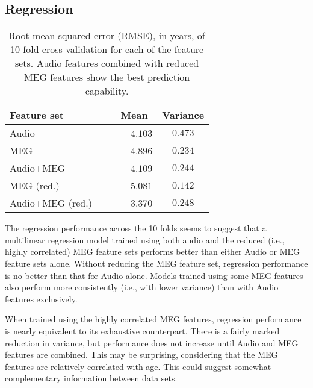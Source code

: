 \documentclass[utf8]{frontiersSCNS} %
\begin{document}
\subsection{Regression}

\begin{table}[t]
  \centering
  \label{tab:reg_results}
  \begin{tabular}{| l | c | c |}
    \toprule
    \multicolumn{1}{l}{\textbf{Feature set}} & \multicolumn{1}{c}{\textbf{Mean}} & \multicolumn{1}{c}{\textbf{Variance}} \\
    \toprule
        Audio~~~                             & ~~~$4.103$         &     $0.473$       \\
        MEG~~~                               & ~~~$4.896$         &     $0.234$       \\
        Audio+MEG~~~                         & ~~~$4.109$         &     $0.244$       \\

        \midrule
       
        MEG (red.)~~~                        & ~~~$5.081$         &     $0.142$       \\
        Audio+MEG (red.)~~~                  & ~~~$3.370$         &     $0.248$       \\

        \bottomrule
  \end{tabular}
  \caption{Root mean squared error (RMSE), in years, of 10-fold cross validation for each of the feature sets. Audio features combined with reduced MEG features show the best prediction capability.}
\end{table}

The regression performance across the 10 folds seems to suggest that a multilinear regression model trained using both audio and the reduced (i.e., highly correlated) MEG feature sets performs better than either Audio or MEG feature sets alone. Without  reducing the MEG feature set, regression performance is no better than that for Audio alone. Models trained using some MEG features also  perform more consistently (i.e., with lower variance) than with Audio features exclusively.

When trained using the highly correlated MEG features, regression performance is nearly equivalent to its exhaustive counterpart. There is a fairly marked reduction in variance, but performance does not increase until Audio and MEG features are combined. This may be surprising, considering that the MEG features are relatively correlated with age. This could suggest somewhat complementary information between data sets. %
\end{document}
